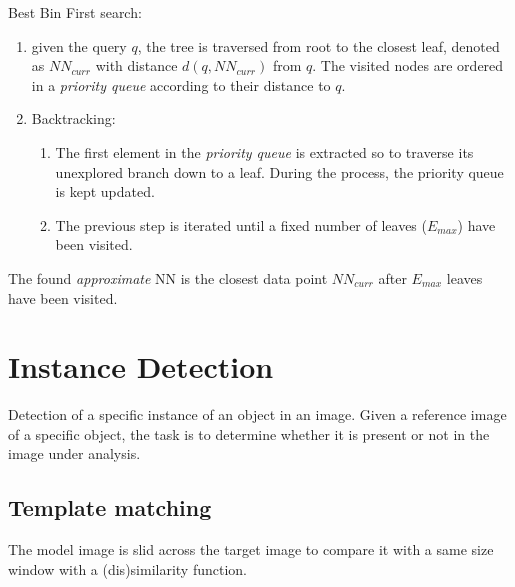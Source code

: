 \documentclass{article}
\begin{document}
Best Bin First search:
\begin{enumerate}
    \item given the query $q$, the tree is traversed from root to the closest leaf, denoted as $NN_{curr}$ with distance $d(q,NN_{curr})$ from $q$. The visited nodes are ordered in a \emph{priority queue} according to their distance to $q$. 
    \item Backtracking:
        \begin{enumerate}
            \item The first element in the \emph{priority queue} is extracted so to traverse its unexplored branch down to a leaf. During the process, the priority queue is kept updated. 
            \item The previous step is iterated until a fixed number of leaves ($E_{max}$) have been visited.
        \end{enumerate}
\end{enumerate}
The found \emph{approximate} NN is the closest data point $NN_{curr}$ after $E_{max}$ leaves have been visited.

\section{Instance Detection}
Detection of a specific instance of an object in an image. Given a reference image of a specific object, the task is to determine whether it is present or not in the image under analysis.

\subsection{Template matching}
The model image is slid across the target image to compare it with a same size window with a (dis)similarity function.
\end{document}
